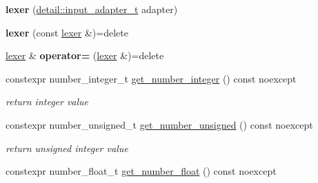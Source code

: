 \begin{DoxyCompactItemize}
\item 
\mbox{\label{classnlohmann_1_1detail_1_1lexer_a0d7de7b99bc839ea9a39dd738d05d89c}} 
{\bfseries lexer} (\mbox{\hyperlink{namespacenlohmann_1_1detail_ae132f8cd5bb24c5e9b40ad0eafedf1c2}{detail\+::input\+\_\+adapter\+\_\+t}} adapter)
\item 
\mbox{\label{classnlohmann_1_1detail_1_1lexer_a2e8ce2a0d266d148b69dfbcc2e4ad71a}} 
{\bfseries lexer} (const \mbox{\hyperlink{classnlohmann_1_1detail_1_1lexer}{lexer}} \&)=delete
\item 
\mbox{\label{classnlohmann_1_1detail_1_1lexer_a33e97dee7c5faf1b36aff5b74a6c8f55}} 
\mbox{\hyperlink{classnlohmann_1_1detail_1_1lexer}{lexer}} \& {\bfseries operator=} (\mbox{\hyperlink{classnlohmann_1_1detail_1_1lexer}{lexer}} \&)=delete
\item 
\mbox{\label{classnlohmann_1_1detail_1_1lexer_afa338d17c0a7e834c73104258a2c8ced}} 
constexpr number\+\_\+integer\+\_\+t \mbox{\hyperlink{classnlohmann_1_1detail_1_1lexer_afa338d17c0a7e834c73104258a2c8ced}{get\+\_\+number\+\_\+integer}} () const noexcept
\begin{DoxyCompactList}\small\item\em return integer value \end{DoxyCompactList}\item 
\mbox{\label{classnlohmann_1_1detail_1_1lexer_a56640fb92293e0c17742ca3c814d74d6}} 
constexpr number\+\_\+unsigned\+\_\+t \mbox{\hyperlink{classnlohmann_1_1detail_1_1lexer_a56640fb92293e0c17742ca3c814d74d6}{get\+\_\+number\+\_\+unsigned}} () const noexcept
\begin{DoxyCompactList}\small\item\em return unsigned integer value \end{DoxyCompactList}\item 
\mbox{\label{classnlohmann_1_1detail_1_1lexer_ac013af35a21e9387993b19da5b3e0ae2}} 
constexpr number\+\_\+float\+\_\+t \mbox{\hyperlink{classnlohmann_1_1detail_1_1lexer_ac013af35a21e9387993b19da5b3e0ae2}{get\+\_\+number\+\_\+float}} () const noexcept

\end{DoxyCompactItemize}

